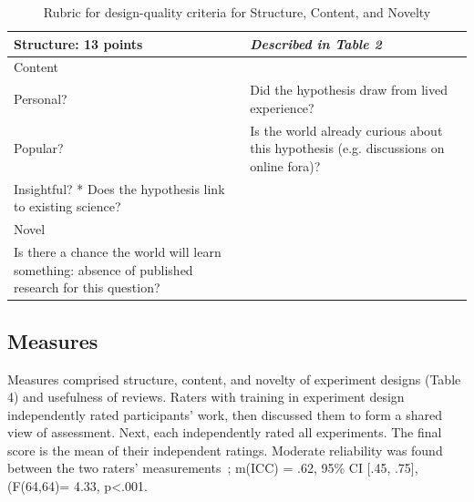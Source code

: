 \vspace{0.25in}
\begin{table}[!ht]
\caption[]{Rubric for design-quality criteria for Structure, Content, and Novelty}

\vspace{-0.25in}
\begin{center}
\begin{tabular}{|p{1in}|p{2in}|p{3in}|}

\hline
Structure: 13 points &  \textit{Described in Table 2} \\

\hline
Content  & \\
\hline
Personal? & Did the hypothesis draw from lived experience? \\
Popular? & Is the world already curious about this hypothesis (e.g. discussions on online fora)?  \\
Insightful? * Does the hypothesis link to existing science?  \\

\hline
Novel  &  \\
\hline
Is there a chance the world will learn something: absence of published research for this question? &  \\

\hline
\end{tabular}
\end{center}
\label{tab:rubric2}
\end{table}

\subsection{Measures}
Measures comprised structure, content, and novelty of experiment designs (Table 4) and usefulness of reviews. Raters with training in experiment design independently rated participants’ work, then discussed them to form a shared view of assessment. Next, each independently rated all experiments. The final score is the mean of their independent ratings. Moderate reliability was found between the two raters’ measurements~\cite{koo2016guideline}; m(ICC) = .62, 95\% CI [.45, .75], (F(64,64)= 4.33, p<.001. 

